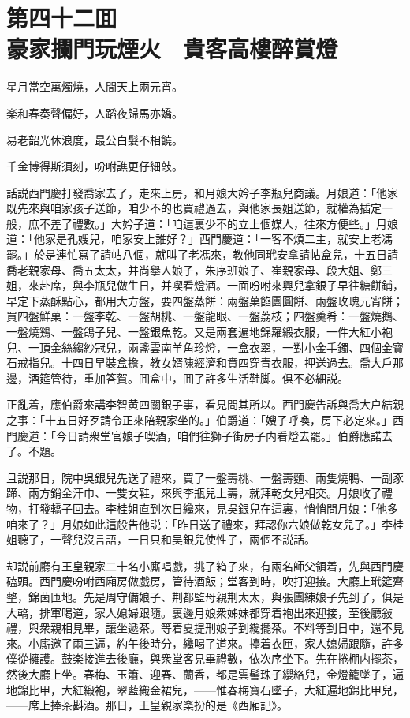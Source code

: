 
\chapter*{第四十二囬　\\豪家攔門玩煙火　貴客高樓醉賞燈}


\begin{myquote}
星月當空萬燭燒，人間天上兩元宵。

楽和春奏聲偏好，人蹈夜歸馬亦嬌。

易老韶光休浪度，最公白髮不相饒。

千金博得斯須刻，吩咐譙更仔細敲。
\end{myquote}

話説西門慶打發喬家去了，走來上房，和月娘大妗子李瓶兒商議。月娘道：「他家既先來與咱家孩子送節，咱少不的也買禮過去，與他家長姐送節，就權為插定一般，庶不差了禮數。」大妗子道：「咱這裏少不的立上個媒人，往來方便些。」月娘道：「他家是孔嫂兒，咱家安上誰好？」西門慶道：「一客不煩二主，就安上老馮罷。」於是連忙冩了請帖八個，就叫了老馮來，教他同玳安拿請帖盒兒，十五日請喬老親家母、喬五太太，并尚擧人娘子，朱序班娘子、崔親家母、段大姐、鄭三姐，來赴席，與李瓶兒做生日，并喫看燈酒。一面吩咐來興兒拿銀子早往糖餅鋪，早定下蒸酥點心，都用大方盤，要四盤蒸餅：兩盤菓餡團圓餅、兩盤玫瑰元宵餅；買四盤鮮菓：一盤李乾、一盤胡桃、一盤龍眼、一盤荔枝；四盤羹肴：一盤燒鵝、一盤燒鷄、一盤鴿子兒、一盤銀魚乾。又是兩套遍地錦羅緞衣服，一件大紅小袍兒、一頂金絲縐紗冠兒，兩盞雲南羊角珍燈，一盒衣翠，一對小金手鐲、四個金寳石戒指兒。十四日早裝盒擔，教女婿陳經濟和賁四穿青衣服，押送過去。喬大戶那邊，酒筵管待，重加答賀。囬盒中，囬了許多生活鞋脚。俱不必細説。

正亂着，應伯爵來講李智黄四關銀子事，看見問其所以。西門慶告訴與喬大户結親之事：「十五日好歹請令正來陪親家坐的。」伯爵道：「嫂子呼喚，房下必定來。」西門慶道：「今日請衆堂官娘子喫酒，咱們往獅子街房子内看燈去罷。」伯爵應諾去了。不題。

且説那日，院中吳銀兒先送了禮來，買了一盤壽桃、一盤壽麵、兩隻燒鴨、一副豕蹄、兩方銷金汗巾、一雙女鞋，來與李瓶兒上壽，就拜乾女兒相交。月娘收了禮物，打發轎子回去。李桂姐直到次日纔來，見吳銀兒在這裏，悄悄問月娘：「他多咱來了？」月娘如此這般告他説：「昨日送了禮來，拜認你六娘做乾女兒了。」李桂姐聽了，一聲兒沒言語，一日只和吴銀兒使性子，兩個不説話。

却説前廳有王皇親家二十名小廝唱戲，挑了箱子來，有兩名師父領着，先與西門慶磕頭。西門慶吩咐西廂房做戲房，管待酒飯；堂客到時，吹打迎接。大廳上玳筵齊整，錦茵匝地。先是周守備娘子、荆都監母親荆太太，與張團練娘子先到了，俱是大轎，排軍喝道，家人媳婦跟隨。裏邊月娘衆姊妹都穿着袍出來迎接，至後廳敍禮，與衆親相見畢，讓坐遞茶。等着夏提刑娘子到纔擺茶。不料等到日中，還不見來。小廝邀了兩三遍，約午後時分，纔喝了道來。擡着衣匣，家人媳婦跟隨，許多僕從擁護。鼓楽接進去後廳，與衆堂客見畢禮數，依次序坐下。先在捲棚内擺茶，然後大廳上坐。春梅、玉簫、迎春、蘭香，都是雲髻珠子纓絡兒，金燈籠墜子，遍地錦比甲，大紅緞袍，翠藍織金裙兒，——惟春梅寳石墜子，大紅遍地錦比甲兒，——席上捧茶斟酒。那日，王皇親家楽扮的是《西廂記》。

